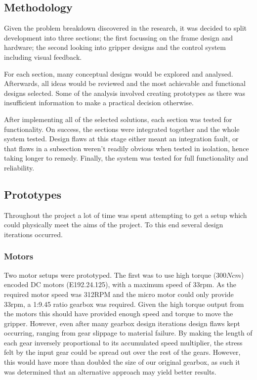 \documentclass[conference]{IEEEtran}
\begin{document}
\subsection{Methodology}
Given the problem breakdown discovered in the research, it was decided to split development into three sections; the first focussing on the frame design and hardware; the second looking into gripper designs and the control system including visual feedback.

For each section, many conceptual designs would be explored and analysed. Afterwards, all ideas would be reviewed and the most achievable and functional designs selected. Some of the analysis involved creating prototypes as there was insufficient information to make a practical decision otherwise.

After implementing all of the selected solutions, each section was tested for functionality. On success, the sections were integrated together and the whole system tested. Design flaws at this stage either meant an integration fault, or that flaws in a subsection weren't readily obvious when tested in isolation, hence taking longer to remedy. Finally, the system was tested for full functionality and reliability.


\subsection{Prototypes}\label{prototypes}
Throughout the project a lot of time was spent attempting to get a setup which could physically meet the aims of the project. To this end several design iterations occurred.

\subsubsection{Motors}
Two motor setups were prototyped. The first was to use high torque ($300Ncm$) encoded DC motors (E192.24.125), with a maximum speed of 33rpm. As the required motor speed was 312RPM and the micro motor could only provide 33rpm, a 1:9.45 ratio gearbox was required. Given the high torque output from the motors this should have provided enough speed and torque to move the gripper. However, even after many gearbox design iterations design flaws kept occurring, ranging from gear slippage to material failure. By making the length of each gear inversely proportional to its accumulated speed multiplier, the stress felt by the input gear could be spread out over the rest of the gears. However, this would have more than doubled the size of our original gearbox, as such it was determined that an alternative approach may yield better results.
\end{document}
